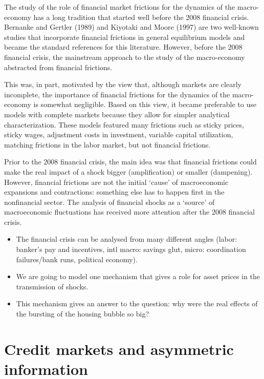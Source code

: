 The study of the role of financial market frictions for the dynamics of the macro-economy
has a long tradition that started well before the 2008 financial crisis. Bernanke and Gertler
(1989) and Kiyotaki and Moore (1997) are two well-known studies that incorporate financial
frictions in general equilibrium models and became the standard references for this literature.
However, before the 2008 financial crisis, the mainstream approach to the study of the
macro-economy abstracted from financial frictions.

This was, in part, motivated by the view that, although markets are clearly incomplete, 
the importance of financial frictions for the dynamics of the macro-economy is somewhat negligible. 
Based on this view, it became preferable to use models with complete markets because they allow 
for simpler analytical characterization. These models featured many frictions such as sticky prices, 
sticky wages, adjustment costs in investment, variable capital utilization, matching frictions in the labor
market, but not financial frictions.

Prior to the 2008 financial crisis, the main idea was that financial frictions could make the real
impact of a shock bigger (amplification) or smaller (dampening). However, financial frictions
are not the initial ‘cause’ of macroeconomic expansions and contractions: something else has
to happen first in the nonfinancial sector. The analysis of financial shocks as a ‘source’ of
macroeconomic fluctuations has received more attention after the 2008 financial crisis.

\begin{itemize}
    \item The financial crisis can be analysed from many different angles
    (labor: banker’s pay and incentives, intl macro: savings glut,
    micro: coordination failures/bank runs, political economy).
    \item We are going to model one mechanism that gives a role for
    asset prices in the transmission of shocks.
    \item This mechanism gives an answer to the question: why were
    the real effects of the bursting of the housing bubble so big?
\end{itemize}

\section{Credit markets and asymmetric information}

